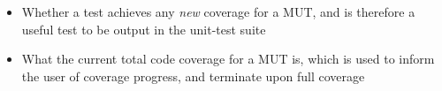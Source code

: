 \begin{itemize}
   \item Whether a test achieves any \emph{new} coverage for a MUT, and is therefore a useful test to be output in the unit-test suite
   \item What the current total code coverage for a MUT is, which is used to inform the user of coverage progress, and terminate upon full coverage
\end{itemize}

